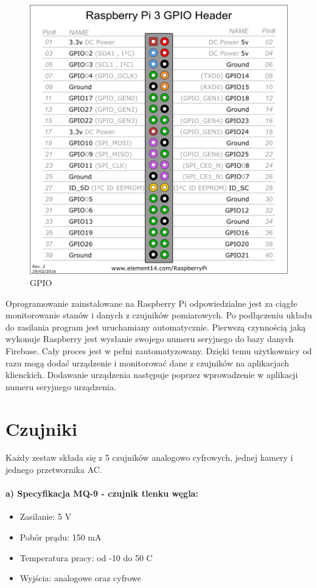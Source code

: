 \begin{figure}[h]
\begin{minipage}[b]{0.4\textwidth}
    \includegraphics[width=\textwidth]{gpio.png}
    \caption{GPIO}
  \end{minipage}
\end{figure}
Oprogramowanie zainstalowane na Raspberry Pi odpowiedzialne jest za ciągłe monitorowanie stanów i danych z czujników pomiarowych. Po podłączeniu układu do zasilania program jest uruchamiany automatycznie. Pierwszą czynnością jaką wykonuje Raspberry jest wysłanie swojego numeru seryjnego do bazy danych Firebase. Cały proces jest w pełni zautomatyzowany. Dzięki temu użytkownicy od razu mogą dodać urządzenie i monitorować dane z czujników na aplikacjach klienckich. Dodawanie urządzenia następuje poprzez wprowadzenie w aplikacji numeru seryjnego urządzenia.

\section*{Czujniki}
Każdy zestaw składa się z 5 czujników analogowo cyfrowych,  jednej kamery i jednego przetwornika AC. 
\paragraph{a) Specyfikacja MQ-9 - czujnik tlenku węgla:}
\begin{itemize} 
\item Zasilanie: 5 V
\item Pobór prądu: 150 mA
\item Temperatura pracy: od -10 do 50 \textdegree{}C
\item Wyjścia: analogowe oraz cyfrowe
\end{itemize}

